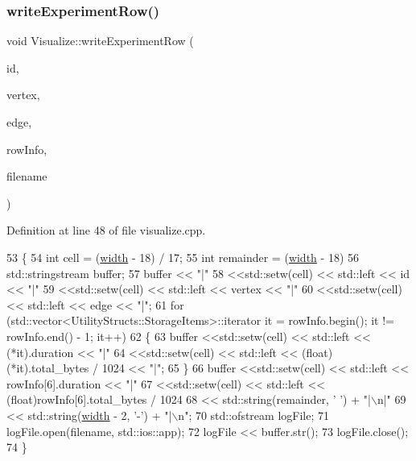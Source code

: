 \subsubsection{\texorpdfstring{write\+Experiment\+Row()}{writeExperimentRow()}}
{\footnotesize\ttfamily void Visualize\+::write\+Experiment\+Row (\begin{DoxyParamCaption}\item[{int}]{id,  }\item[{int}]{vertex,  }\item[{int}]{edge,  }\item[{std\+::vector$<$ \hyperlink{struct_utility_structs_1_1_storage_items}{Utility\+Structs\+::\+Storage\+Items} $>$}]{row\+Info,  }\item[{std\+::string}]{filename }\end{DoxyParamCaption})}



Definition at line 48 of file visualize.\+cpp.


\begin{DoxyCode}
53 \{
54     \textcolor{keywordtype}{int} cell = (\hyperlink{class_visualize_af5ac723ad5f8fe8c4a8378bf1299cda7}{width} - 18) / 17;
55     \textcolor{keywordtype}{int} remainder = (\hyperlink{class_visualize_af5ac723ad5f8fe8c4a8378bf1299cda7}{width} - 18) %
56     std::stringstream buffer;
57     buffer << \textcolor{stringliteral}{"|"}
58            <<std::setw(cell) << std::left << \textcolor{keywordtype}{id} << \textcolor{stringliteral}{"|"}
59            <<std::setw(cell) << std::left << vertex << \textcolor{stringliteral}{"|"}
60            <<std::setw(cell) << std::left << edge << \textcolor{stringliteral}{"|"};
61     \textcolor{keywordflow}{for} (std::vector<UtilityStructs::StorageItems>::iterator it = rowInfo.begin(); it != rowInfo.end() - 1;
       it++)
62     \{
63         buffer <<std::setw(cell) << std::left << (*it).duration << \textcolor{stringliteral}{"|"}
64                <<std::setw(cell) << std::left << (float)(*it).total\_bytes / 1024 << \textcolor{stringliteral}{"|"};
65     \}
66     buffer <<std::setw(cell) << std::left << rowInfo[6].duration << \textcolor{stringliteral}{"|"}
67            <<std::setw(cell) << std::left << (float)rowInfo[6].total\_bytes / 1024
68            << std::string(remainder, \textcolor{charliteral}{' '}) + \textcolor{stringliteral}{"|\(\backslash\)n|"}
69            << std::string(\hyperlink{class_visualize_af5ac723ad5f8fe8c4a8378bf1299cda7}{width} - 2, \textcolor{charliteral}{'-'}) + \textcolor{stringliteral}{"|\(\backslash\)n"};
70     std::ofstream logFile;
71     logFile.open(filename, std::ios::app);
72     logFile << buffer.str();
73     logFile.close();
74 \}
\end{DoxyCode}
\mbox{\label{class_visualize_a8677a063c82af1b37b94c7d3a3ca3746}} 
